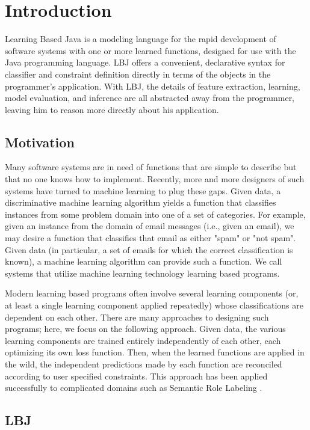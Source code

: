 
\chapter{Introduction}

Learning Based Java is a modeling language for the rapid development of
software systems with one or more learned functions, designed for use with the
Java programming language.  LBJ offers a convenient, declarative syntax for
classifier and constraint definition directly in terms of the objects in the
programmer's application.  With LBJ, the details of feature extraction,
learning, model evaluation, and inference are all abstracted away from the
programmer, leaving him to reason more directly about his application.

\section{Motivation}

Many software systems are in need of functions that are simple to describe but
that no one knows how to implement.  Recently, more and more designers of such
systems have turned to machine learning to plug these gaps.  Given data, a
discriminative machine learning algorithm yields a function that classifies
instances from some problem domain into one of a set of categories.  For
example, given an instance from the domain of email messages (i.e., given an
email), we may desire a function that classifies that email as either "spam"
or "not spam".  Given data (in particular, a set of emails for which the
correct classification is known), a machine learning algorithm can provide
such a function.  We call systems that utilize machine learning technology
learning based programs.

Modern learning based programs often involve several learning components (or,
at least a single learning component applied repeatedly) whose classifications
are dependent on each other.  There are many approaches to designing such
programs; here, we focus on the following approach.  Given data, the various
learning components are trained entirely independently of each other, each
optimizing its own loss function.  Then, when the learned functions are
applied in the wild, the independent predictions made by each function are
reconciled according to user specified constraints.  This approach has been
applied successfully to complicated domains such as Semantic Role Labeling
\cite{PunyakanokRoYi08}.

\section{LBJ}

